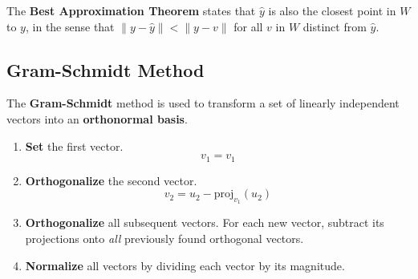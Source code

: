 \documentclass[12pt, letterpaper]{article}
\begin{document}
  The \textbf{Best Approximation Theorem} states that $ \hat{y} $ is
  also the closest point in $ W $ to $ y $, in the sense that $ \| y
  - \hat{y} \| < \| y - v \| $ for all $ v $ in $ W $ distinct from $ \hat{y} $.

  \subsection*{Gram-Schmidt Method}

  The \textbf{Gram-Schmidt} method is used to transform a set of
  linearly independent vectors into an \textbf{orthonormal basis}.

  \begin{enumerate}
    \item \textbf{Set} the first vector.
      \[
        v_1 = v_1
      \]
    \item \textbf{Orthogonalize} the second vector.
      \[
        v_2 = u_2 - \textrm{proj}_{v_1}(u_2)
      \]
    \item \textbf{Orthogonalize} all subsequent vectors. For each new
      vector, subtract its projections onto \textit{all} previously
      found orthogonal vectors.
    \item \textbf{Normalize} all vectors by dividing each vector by
      its magnitude.
  \end{enumerate}

  
\end{document}
